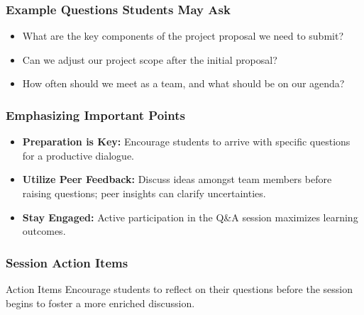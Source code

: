 \documentclass[aspectratio=169]{beamer}
\begin{document}
\begin{frame}[fragile]
    \frametitle{Example Questions Students May Ask}
    \begin{itemize}
        \item What are the key components of the project proposal we need to submit?
        \item Can we adjust our project scope after the initial proposal?
        \item How often should we meet as a team, and what should be on our agenda?
    \end{itemize}
\end{frame}

\begin{frame}[fragile]
    \frametitle{Emphasizing Important Points}
    \begin{itemize}
        \item \textbf{Preparation is Key:} Encourage students to arrive with specific questions for a productive dialogue.
        \item \textbf{Utilize Peer Feedback:} Discuss ideas amongst team members before raising questions; peer insights can clarify uncertainties.
        \item \textbf{Stay Engaged:} Active participation in the Q\&A session maximizes learning outcomes.
    \end{itemize}
\end{frame}

\begin{frame}[fragile]
    \frametitle{Session Action Items}
    \begin{block}{Action Items}
        Encourage students to reflect on their questions before the session begins to foster a more enriched discussion.
    \end{block}
\end{frame}
\end{document}
